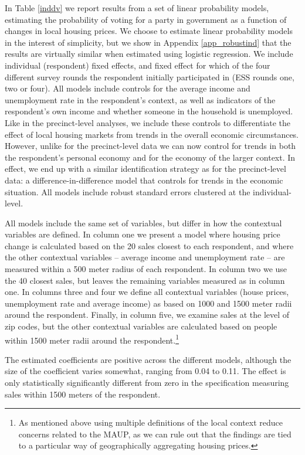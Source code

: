 \documentclass[12pt,a4paper]{article}
\begin{document}
	In Table \ref{inddv} we report results from a set of linear probability models, estimating the probability of voting for a party in government as a function of changes in local housing prices. We choose to estimate linear probability models in the interest of simplicity, but we show in Appendix \ref{app_robustind} that the results are virtually similar when estimated using logistic regression. We include individual (respondent) fixed effects, and fixed effect for which of the four different survey rounds the respondent initially participated in (ESS rounds one, two or four). All models include controls for the average income and unemployment rate in the respondent's context, as well as indicators of the respondent's own income and whether someone in the household is unemployed. Like in the precinct-level analyses, we include these controls to differentiate the effect of local housing markets from trends in the overall economic circumstances. However, unlike for the precinct-level data we can now control for trends in both the respondent’s personal economy and for the economy of the larger context. In effect, we end up with a similar identification strategy as for the precinct-level data: a difference-in-difference model that controls for trends in the economic situation. All models include robust standard errors clustered at the individual-level.
	
	All models include the same set of variables, but differ in how the contextual variables are defined. In column one we present a model where housing price change is calculated based on the 20 sales closest to each respondent, and where the other contextual variables -- average income and unemployment rate -- are measured within a 500 meter radius of each respondent. In column two we use the 40 closest sales, but leaves the remaining variables measured as in column one. In columns three and four we define all contextual variables (house prices, unemployment rate and average income) as based on 1000 and 1500 meter radii around the respondent. Finally, in column five, we examine sales at the level of zip codes, but the other contextual variables are calculated based on people within 1500 meter radii around the respondent.\footnote{As mentioned above using multiple definitions of the local context reduce concerns related to the MAUP, as we can rule out that the findings are tied to a particular way of geographically aggregating housing prices. }
	
	
	
	The estimated coefficients are positive across the different models, although the size of the coefficient varies somewhat, ranging from 0.04 to 0.11. The effect is only statistically significantly different from zero in the specification measuring sales within 1500 meters of the respondent.
	
\end{document}
